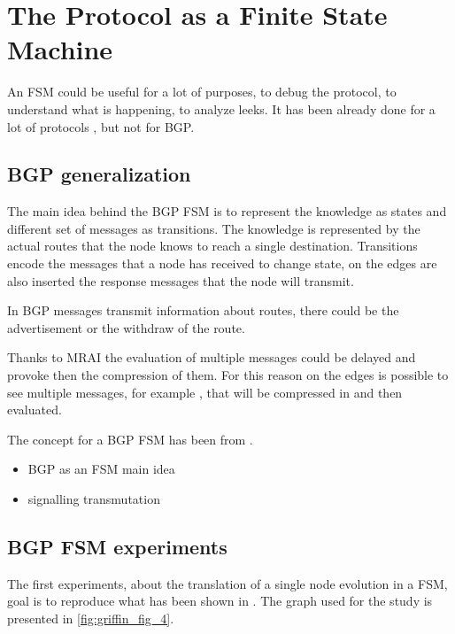 \chapter{The Protocol as a Finite State Machine}
\label{cha:bgp_fsm}

An \ac{FSM} could be useful for a lot of purposes, to debug the protocol, to 
understand what is happening, to analyze leeks.
It has been already done for a lot of protocols , but 
not for \ac{BGP}.


\section{BGP generalization}
\label{sec:bgp_generalization}

The main idea behind the \ac{BGP} \ac{FSM} is to represent the knowledge as
states and different set of messages as transitions.
The knowledge is represented by the actual routes that the node knows to reach
a single destination.
Transitions encode the messages that a node has received to change state,
on the edges are also inserted the response messages that the node will transmit.


In \ac{BGP} messages transmit information about routes, there could be the advertisement
or the withdraw of the route.

Thanks to \ac{MRAI} the evaluation of multiple messages could be delayed and
provoke then the compression of them.
For this reason on the edges is possible to see multiple messages, for example 
, that will be compressed in  and then evaluated.

The concept for a \ac{BGP} \ac{FSM} has been  from \cite{griffinFSM}.

\begin{itemize}
    \item BGP as an FSM main idea
    \item signalling transmutation
\end{itemize}

\section{BGP FSM experiments}
\label{sec:bgp_fsm_experiments}

The first experiments, about the translation of a single node evolution in a
\ac{FSM}, goal is to reproduce what has been shown in \cite{griffinFSM}.
The graph used for the study is presented in \cref{fig:griffin_fig_4}.

